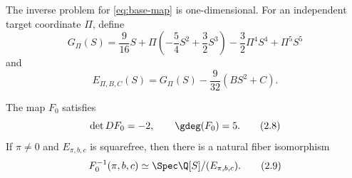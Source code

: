 The inverse problem for \eqref{eq:base-map} is one-dimensional.  For an independent
target coordinate \(\Pi\), define
\[
 G_\Pi(S)=\frac9{16}S
 +\Pi\left(-\frac54S^2+\frac32S^3\right)
 -\frac32\Pi^4S^4+\Pi^5S^5
 \tag{2.6}\label{eq:g-pi}
\]
and
\[
 E_{\Pi,B,C}(S)
 =G_\Pi(S)-\frac9{32}(BS^2+C).
 \tag{2.7}\label{eq:inverse-equation}
\]

\begin{proposition}\label{prop:gauge}
The map \(F_0\) satisfies
\[
 \det DF_0=-2,\qquad \gdeg(F_0)=5.
 \tag{2.8}\label{eq:base-invariants}
\]
If \(\pi\ne0\) and \(E_{\pi,b,c}\) is squarefree, then there is a natural
fiber isomorphism
\[
 F_0^{-1}(\pi,b,c)
 \simeq\Spec\Q[S]/(E_{\pi,b,c}).
 \tag{2.9}\label{eq:base-fiber}
\]
\end{proposition}

